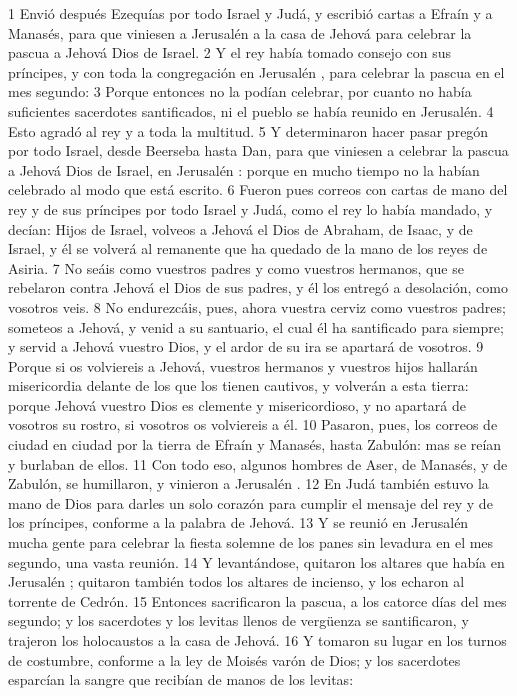 1 Envió después Ezequías por todo Israel y Judá, y escribió cartas a Efraín y a Manasés, para que viniesen a Jerusalén  a la casa de Jehová para celebrar la pascua a Jehová Dios de Israel.
2 Y el rey había tomado consejo con sus príncipes, y con toda la congregación en Jerusalén , para celebrar la pascua en el mes segundo:
3 Porque entonces no la podían celebrar, por cuanto no había suficientes sacerdotes santificados, ni el pueblo se había reunido en Jerusalén. 
4 Esto agradó al rey y a toda la multitud.
5 Y determinaron hacer pasar pregón por todo Israel, desde Beerseba hasta Dan, para que viniesen a celebrar la pascua a Jehová Dios de Israel, en Jerusalén : porque en mucho tiempo no la habían celebrado al modo que está escrito.
6 Fueron pues correos con cartas de mano del rey y de sus príncipes por todo Israel y Judá, como el rey lo había mandado, y decían: Hijos de Israel, volveos a Jehová el Dios de Abraham, de Isaac, y de Israel, y él se volverá al remanente que ha quedado de la mano de los reyes de Asiria.
7 No seáis como vuestros padres y como vuestros hermanos, que se rebelaron contra Jehová el Dios de sus padres, y él los entregó a desolación, como vosotros veis.
8 No endurezcáis, pues, ahora vuestra cerviz como vuestros padres; someteos a Jehová, y venid a su santuario, el cual él ha santificado para siempre; y servid a Jehová vuestro Dios, y el ardor de su ira se apartará de vosotros.
9 Porque si os volviereis a Jehová, vuestros hermanos y vuestros hijos hallarán misericordia delante de los que los tienen cautivos, y volverán a esta tierra: porque Jehová vuestro Dios es clemente y misericordioso, y no apartará de vosotros su rostro, si vosotros os volviereis a él.
10 Pasaron, pues, los correos de ciudad en ciudad por la tierra de Efraín y Manasés, hasta Zabulón: mas se reían y burlaban de ellos.
11 Con todo eso, algunos hombres de Aser, de Manasés, y de Zabulón, se humillaron, y vinieron a Jerusalén .
12 En Judá también estuvo la mano de Dios para darles un solo corazón para cumplir el mensaje del rey y de los príncipes, conforme a la palabra de Jehová.
13 Y se reunió en Jerusalén  mucha gente para celebrar la fiesta solemne de los panes sin levadura en el mes segundo, una vasta reunión.
14 Y levantándose, quitaron los altares que había en Jerusalén ; quitaron también todos los altares de incienso, y los echaron al torrente de Cedrón.
15 Entonces sacrificaron la pascua, a los catorce días del mes segundo; y los sacerdotes y los levitas llenos de vergüenza se santificaron, y trajeron los holocaustos a la casa de Jehová.
16 Y tomaron su lugar en los turnos de costumbre, conforme a la ley de Moisés varón de Dios; y los sacerdotes esparcían la sangre que recibían de manos de los levitas:
